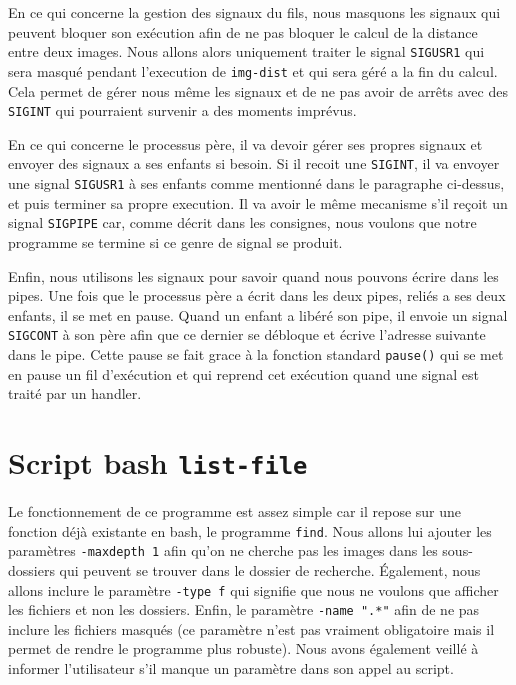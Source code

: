 \documentclass[french]{article}
\begin{document}
En ce qui concerne la gestion des signaux du fils, nous masquons les signaux qui peuvent bloquer son exécution afin de ne pas bloquer le calcul de la distance entre 
deux images. Nous allons alors uniquement traiter le signal \texttt{SIGUSR1} qui sera masqué pendant l'execution de \texttt{img-dist} et qui sera géré a la fin 
du calcul. Cela permet de gérer nous même les signaux et de ne pas avoir de arrêts avec des \texttt{SIGINT} qui pourraient survenir a des moments imprévus. 

En ce qui concerne le processus père, il va devoir gérer ses propres signaux et envoyer des signaux a ses enfants si besoin. Si il recoit une \texttt{SIGINT}, 
il va envoyer une signal \texttt{SIGUSR1} à ses enfants comme mentionné dans le paragraphe ci-dessus, et puis terminer sa propre execution. Il va avoir le même 
mecanisme s'il reçoit un signal \texttt{SIGPIPE} car, comme décrit dans les consignes, nous voulons que notre programme se termine si ce genre de signal 
se produit.

Enfin, nous utilisons les signaux pour savoir quand nous pouvons écrire dans les pipes. Une fois que le processus père a écrit dans les deux pipes, 
reliés a ses deux enfants, il se met en pause. Quand un enfant a libéré son pipe, il envoie un signal \texttt{SIGCONT} à son père afin que ce dernier se débloque 
et écrive l'adresse suivante dans le pipe. Cette pause se fait grace à la fonction standard \texttt{pause()} qui se met en pause un fil d'exécution et qui 
reprend cet exécution quand une signal est traité par un handler.

\section{Script bash \texttt{list-file}}
Le fonctionnement de ce programme est assez simple car il repose sur une fonction déjà existante en bash, le programme \texttt{find}. Nous allons lui ajouter les paramètres 
\texttt{-maxdepth 1} afin qu'on ne cherche pas les images dans les sous-dossiers qui peuvent se trouver dans le dossier de recherche. Également, nous allons inclure 
le paramètre \texttt{-type f} qui signifie que nous ne voulons que afficher les fichiers et non les dossiers. Enfin, le paramètre \texttt{-name ".*"} afin de ne pas 
inclure les fichiers masqués (ce paramètre n'est pas vraiment obligatoire mais il permet de rendre le programme plus robuste). Nous avons également veillé à 
informer l'utilisateur s'il manque un paramètre dans son appel au script. 
\end{document}
